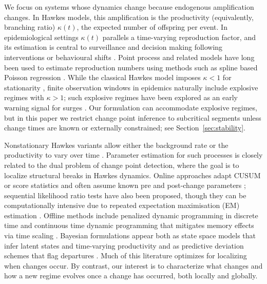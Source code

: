 \documentclass{article}
\theoremstyle{plain}
\theoremstyle{definition}
\newcommand{\1}{\mathbf{1}}
\begin{document}
    We focus on systems whose dynamics change because endogenous amplification changes. In Hawkes models, this amplification is the productivity (equivalently, branching ratio) $\kappa(t)$, the expected number of offspring per event. In epidemiological settings $\kappa(t)$ parallels a time-varying reproduction factor, and its estimation is central to surveillance and decision making following interventions or behavioural shifts \cite{bertozziChallengesModelingForecasting2020b,bootsmaEffectPublicHealth2007,chiang2020hawkes, wallingaDifferentEpidemicCurves2004}. Point process and related models have long been used to estimate reproduction numbers using methods such as spline based Poisson regression \cite{coriNewFrameworkSoftware2013,hong2020estimation}. While the classical Hawkes model imposes $\kappa<1$ for stationarity \cite{hawkes1971spectra}, finite observation windows in epidemics naturally include explosive regimes with $\kappa>1$; such explosive regimes have been explored as an early warning signal for surges \cite{phillipsDetectionSurgesSARSCov22025}. Our formulation can accommodate explosive regimes, but in this paper we restrict change point inference to subcritical segments unless change times are known or externally constrained; see Section~\ref{sec:stability}.
    
    Nonstationary Hawkes variants allow either the background rate or the productivity to vary over time \cite{briz2025self,harte2014etas,kumazawa2014nonstationary,omi2017hawkes,roueff2019time,zhuang2019semiparametric}. Parameter estimation for such processes is closely related to the dual problem of change point detection, where the goal is to localize structural breaks in Hawkes dynamics. Online approaches adapt CUSUM or score statistics and often assume known pre  and post-change parameters \cite{wang2023sequential,zhang2023online}; sequential likelihood ratio tests have also been proposed, though they can be computationally intensive due to repeated expectation maximisation (EM) estimation \cite{li2017detecting}. Offline methods include penalized dynamic programming in discrete time \cite{wangDetectingAbruptChanges2024} and continuous time dynamic programming that mitigates memory effects via time scaling \cite{dion2024multiple}. Bayesian formulations appear both as state space models that infer latent states and time-varying productivity \cite{koyamaEstimatingTimevaryingReproduction2021} and as predictive deviation schemes that flag departures \cite{zhang2024conjugate}. Much of this literature optimizes for localizing when changes occur. By contrast, our interest is to characterize what changes and how a new regime evolves once a change has occurred, both locally and globally.
    
\end{document}
